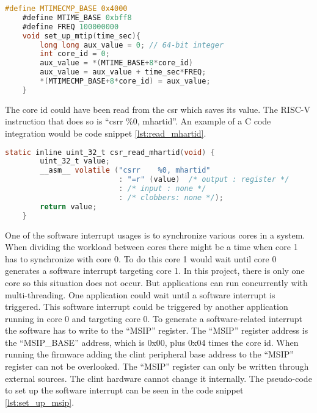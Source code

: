 \begin{lstlisting}[language=C, caption={Set Up Timer Interrupt.}, label=lst:set_up_mtip]
    #define MTIMECMP_BASE 0x4000
    #define MTIME_BASE 0xbff8
    #define FREQ 100000000
    void set_up_mtip(time_sec){
        long long aux_value = 0; // 64-bit integer
        int core_id = 0;
        aux_value = *(MTIME_BASE+8*core_id)
        aux_value = aux_value + time_sec*FREQ;
        *(MTIMECMP_BASE+8*core_id) = aux_value;
    }
\end{lstlisting}

The core id could have been read from the \acrshort{csr} which saves its value. The RISC-V instruction that does so is \enquote{csrr    \%0, mhartid}. An example of a C code integration would be code snippet \ref*{lst:read_mhartid}.

\begin{lstlisting}[language=C, caption={Read core id from \acrshort{csr}.}, label=lst:read_mhartid]
    static inline uint_32_t csr_read_mhartid(void) {
        uint_32_t value;        
        __asm__ volatile ("csrr    %0, mhartid"
                          : "=r" (value)  /* output : register */
                          : /* input : none */
                          : /* clobbers: none */);
        return value;
    }
\end{lstlisting}

One of the software interrupt usages is to synchronize various cores in a system. When dividing the workload between cores there might be a time when core 1 has to synchronize with core 0. To do this core 1 would wait until core 0 generates a software interrupt targeting core 1. In this project, there is only one core so this situation does not occur. But applications can run concurrently with multi-threading. One application could wait until a software interrupt is triggered. This software interrupt could be triggered by another application running in core 0 and targeting core 0. To generate a software-related interrupt the software has to write to the \enquote{MSIP} register. The \enquote{MSIP} register address is the \enquote{MSIP\_BASE} address, which is 0x00, plus 0x04 times the core id. When running the firmware adding the \acrshort{clint} peripheral base address to the \enquote{MSIP} register can not be overlooked. The \enquote{MSIP} register can only be written through external sources. The \acrshort{clint} hardware cannot change it internally. The pseudo-code to set up the software interrupt can be seen in the code snippet \ref*{lst:set_up_msip}.

